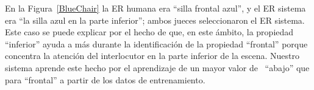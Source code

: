 
En la Figura~\ref{BlueChair} la ER humana era ``silla frontal azul'', y el ER sistema era ``la silla azul en la parte inferior''; ambos jueces seleccionaron el ER sistema. Este caso se puede explicar por el hecho de que, en este \'ambito, la propiedad ``inferior'' ayuda a m\'as durante la identificaci\'on de la propiedad ``frontal'' porque concentra la atenci\'on del interlocutor en la parte inferior de la escena. Nuestro sistema aprende este hecho por el aprendizaje de un mayor valor de \puse\ ``abajo'' que para ``frontal'' a partir de los datos de entrenamiento.

